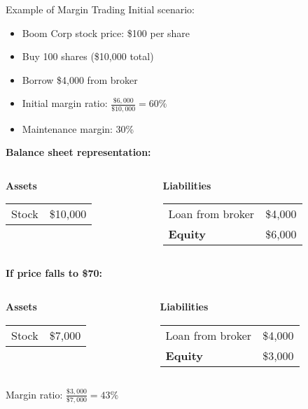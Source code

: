 \documentclass[10pt,handout]{beamer}
\begin{document}
\begin{frame}{Example of Margin Trading}
  Initial scenario:
  \begin{itemize}
    \item Boom Corp stock price: \$100 per share
    \item Buy 100 shares (\$10,000 total)
    \item Borrow \$4,000 from broker
    \item Initial margin ratio: $\tfrac{\$6,000}{\$10,000} = 60\%$
    \item Maintenance margin: 30\%
  \end{itemize}
  
  \pause
  \textbf{Balance sheet representation:}
  \begin{columns}
    \begin{column}{0.45\textwidth}
      \textbf{Assets} \vspace{0.2em}\\
      \begin{tabular}{lr}
        Stock & \$10,000 \\
      \end{tabular}
    \end{column}
    \begin{column}{0.45\textwidth}
      \textbf{Liabilities} \vspace{0.2em}\\
      \begin{tabular}{lr}
        Loan from broker & \$4,000 \\[0.5em]
        \textbf{Equity} & \$6,000 \\
      \end{tabular}
    \end{column}
  \end{columns}
  
  \pause
  \textbf{If price falls to \$70:}
  \begin{columns}
    \begin{column}{0.45\textwidth}
      \textbf{Assets} \vspace{0.2em}\\
      \begin{tabular}{lr}
        Stock & \$7,000 \\
      \end{tabular}
    \end{column}
    \begin{column}{0.45\textwidth}
      \textbf{Liabilities} \vspace{0.2em}\\
      \begin{tabular}{lr}
        Loan from broker & \$4,000 \\[0.5em]
        \textbf{Equity} & \$3,000 \\
      \end{tabular}
    \end{column}
  \end{columns}

  \pause
  Margin ratio: $\tfrac{\$3,000}{\$7,000} = 43\%$
\end{frame}
\end{document}
